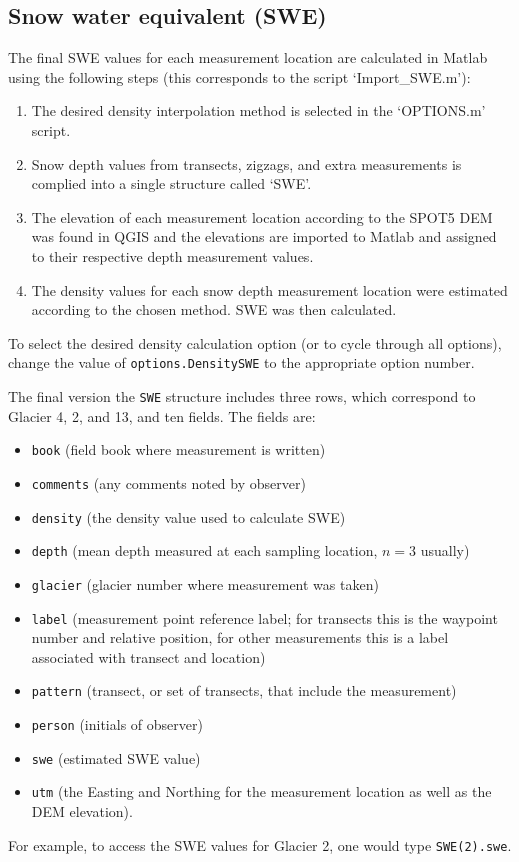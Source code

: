 \documentclass{sfuthesis}
\begin{document}
\begin{appendices}
\section{Snow water equivalent (SWE)}

The final SWE values for each measurement location are calculated in Matlab using the following steps (this corresponds to the script `Import\_SWE.m'):
\begin{enumerate}
\item The desired density interpolation method is selected in the `OPTIONS.m' script.
\item Snow depth values from transects, zigzags, and extra measurements is complied into a single structure called `SWE'.
\item The elevation of each measurement location according to the SPOT5 DEM was found in QGIS and the elevations are imported to Matlab and assigned to their respective depth measurement values.
\item The density values for each snow depth measurement location were estimated according to the chosen method. SWE was then calculated. 
\end{enumerate}
To select the desired density calculation option (or to cycle through all options), change the value of \texttt{options.DensitySWE} to the appropriate option number.

The final version the \texttt{SWE} structure includes three rows, which correspond to Glacier 4, 2, and 13, and ten fields. The fields are: 
\begin{itemize}
\item \texttt{book} (field book where measurement is written)
\item \texttt{comments} (any comments noted by observer)
\item \texttt{density} (the density value used to calculate SWE)
\item \texttt{depth} (mean depth measured at each sampling location, $n=3$ usually)
\item \texttt{glacier} (glacier number where measurement was taken)
\item \texttt{label} (measurement point reference label; for transects this is the waypoint number and relative position, for other measurements this is a label associated with transect and location)
\item \texttt{pattern} (transect, or set of transects, that include the measurement)
\item \texttt{person} (initials of observer)
\item \texttt{swe} (estimated SWE value)
\item \texttt{utm} (the Easting and Northing for the measurement location as well as the DEM elevation). 
\end{itemize}
For example, to access the SWE values for Glacier 2, one would type \texttt{SWE(2).swe}. 


\end{appendices}
\end{document}
